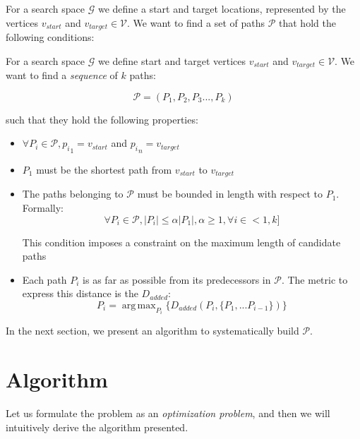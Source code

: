 \documentclass[graybox]{svmult}
\newcommand{\PathSet}{\ensuremath{\mathcal P} }
\newcommand{\PathSequence}{\ensuremath{\mathcal P} }
\newcommand{\Path}{\ensuremath{P} }
\newcommand{\Graph}{\ensuremath{\mathcal G} }
\newcommand{\VertexSet}{\ensuremath{\mathcal V} }
\newcommand{\AddedDistance}{\ensuremath{D_{added}} }
\DeclareMathOperator*{\argmax}{arg\,max}
\begin{document}
\begin{definition}

\label{def:DiversePathProblem}
For a search space \Graph we define a start and target locations, represented by the vertices $v_{start}$ and $v_{target} \in \VertexSet$.  We want to find a set of paths $\PathSet$ that hold the following conditions:

For a search space \Graph we define start and target vertices $v_{start}$ and $v_{target} \in \VertexSet$.  We want to find a \emph{sequence} of $k$ paths:

\[ \PathSequence = ( \Path_{1}, \Path_{2}, \Path_{3}..., \Path_{k} )  \]

such that they hold the following properties:

\begin{itemize}
\item{ $ \forall \Path_{i} \in \PathSequence, {p_{i}}_{1} = v_{start}$ and ${p_{i}}_{n} = v_{target}$}
\item{ $\Path_{1}$ must be the shortest path from $v_{start}$ to $v_{target}$ }
\item{The paths belonging to $\PathSet$ must be bounded in length with respect to $\Path_{1}$. Formally:
\begin{equation} 
\forall \Path_{i} \in \PathSet, \left | \Path_{i} \right | \leq \alpha \left| \Path_{1} \right |, \alpha \geq 1, \forall i \in <1, k ] 
\label{eq:LengthBound}
\end{equation}

This condition imposes a constraint on the maximum length of candidate paths}
\item{Each path $\Path_{i}$ is as far as possible from its predecessors in $\PathSequence$. The metric to express this distance is the $\AddedDistance$:
	\begin{equation}
		\Path_{i} = \argmax_{\Path_{i}}  \{ \AddedDistance ( \Path_{i}, \{ \Path _{1},...\Path _{i-1} \} ) \}
		\label{eq:MaxDistance}	
	\end{equation}
}

\end{itemize}
\end{definition}

In the next section, we present an algorithm to systematically build $\PathSet$.

\section{Algorithm}
Let us formulate the problem as an \emph{optimization problem}, and then we will intuitively derive the algorithm presented.
\end{document}
